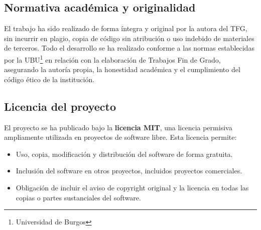 \subsection{Normativa académica y originalidad}

El trabajo ha sido realizado de forma íntegra y original por la autora del TFG, sin incurrir en plagio, copia de código sin atribución o uso indebido de materiales de terceros.
Todo el desarrollo se ha realizado conforme a las normas establecidas por la UBU\footnote{Universidad de Burgos} en relación con la elaboración de Trabajos Fin de Grado, asegurando la autoría propia, la honestidad académica y el cumplimiento del código ético de la institución.

\subsection{Licencia del proyecto}

El proyecto se ha publicado bajo la \textbf{licencia MIT}, una licencia permisiva ampliamente utilizada en proyectos de software libre. Esta licencia permite:

\begin{itemize}
    \item Uso, copia, modificación y distribución del software de forma gratuita.
    \item Inclusión del software en otros proyectos, incluidos proyectos comerciales.
    \item Obligación de incluir el aviso de copyright original y la licencia en todas las copias o partes sustanciales del software.
\end{itemize}




